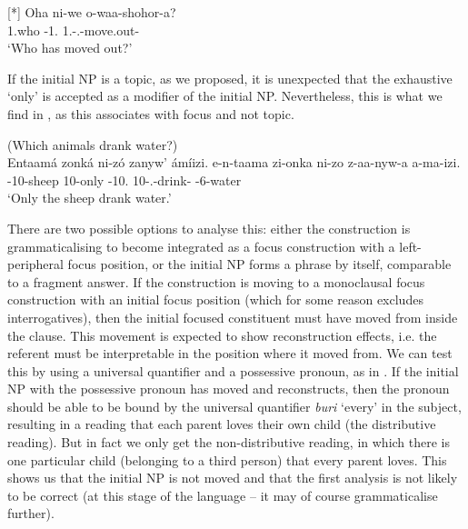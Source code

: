 \documentclass[output=paper]{langscibook}
\begin{document}
\ex
[*]{
\gll
Oha  ni-we  o-waa-shohor-a?\\
1.who  \COP{}-1.\PRO{}  1\SM{}.\REL{}-\N{}.\PST{}-move.out-\FV{}\\
\glt
‘Who has moved out?’\\
}

\z
\z

If the initial NP is a topic, as we proposed, it is unexpected that the exhaustive ‘only’ is accepted as a modifier of the initial NP. Nevertheless, this is what we find in , as this associates with focus and not topic.

\ea
\label{bkm:Ref98948346}
(Which animals drank water?)\\
Entaamá  zonká  ni-zó  zanyw’  ámíizi.
\gll
e-n-taama  zi-onka  ni-zo  z-aa-nyw-a  a-ma-izi.\\
\AUG{}-10-sheep  10-only  \COP{}-10.\PRO{}  10\SM{}-\N{}.\PST{}-drink-\FV{}  \AUG{}-6-water\\
\glt
‘Only the sheep drank water.’\\


\z


There are two possible options to analyse this: either the construction is grammaticalising to become integrated as a focus construction with a left-peripheral focus position, or the initial NP forms a phrase by itself, comparable to a fragment answer. If the construction is moving to a monoclausal focus construction with an initial focus position (which for some reason excludes interrogatives), then the initial focused constituent must have moved from inside the clause. This movement is expected to show reconstruction effects, i.e. the referent must be interpretable in the position where it moved from. We can test this by using a universal quantifier and a possessive pronoun, as in . If the initial NP with the possessive pronoun has moved and reconstructs, then the pronoun should be able to be bound by the universal quantifier \textit{buri} ‘every’ in the subject, resulting in a reading that each parent loves their own child (the distributive reading). But in fact we only get the non-distributive reading, in which there is one particular child (belonging to a third person) that every parent loves. This shows us that the initial NP is not moved and that the first analysis is not likely to be correct (at this stage of the language – it may of course grammaticalise further).
\end{document}
